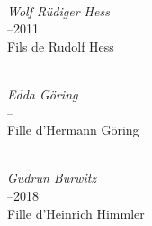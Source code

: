 \noindent\begin{minipage}[t][\textheight][s]{\textwidth}

\vspace*{\fill}

\begin{center}

  \begin{minipage}[t]{0.44\textwidth}
    \centering
    \\[-0.4em]
    {\figcaptionname\itshape Wolf Rüdiger Hess}\\[-0.4em]
    {--2011}\\[-0.4em]
    {\figcaptiondetail Fils de Rudolf Hess}
  \end{minipage}
  \hfill
  \begin{minipage}[t]{0.44\textwidth}
    \centering
    \\[-0.4em]
    {\figcaptionname\itshape Edda Göring}\\[-0.4em]
    {--}\\[-0.4em]
    {\figcaptiondetail Fille d'Hermann Göring}
  \end{minipage}

\end{center}

\vspace{\baselineskip}

\begin{center}

  \begin{minipage}[t]{0.60\textwidth}
    \centering
    \\[-0.4em]
    {\figcaptionname\itshape Gudrun Burwitz}\\[-0.4em]
    {--2018}\\[-0.4em]
    {\figcaptiondetail Fille d'Heinrich Himmler}
  \end{minipage}

\end{center}

\vspace*{\fill}

\end{minipage}
